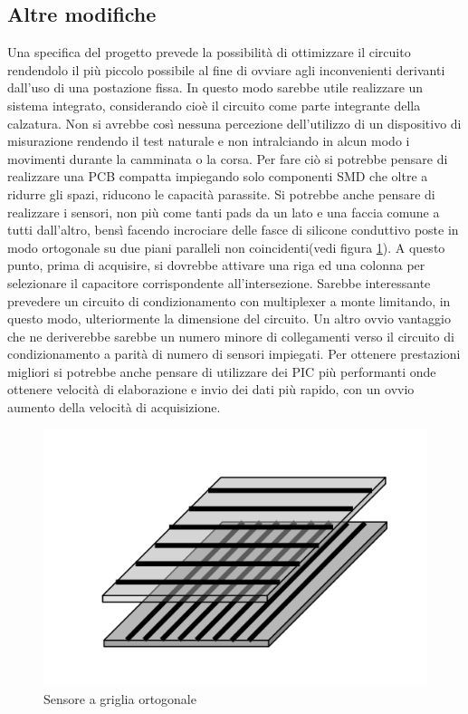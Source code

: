\documentclass[12pt,a4paper,oneside,openright,italian]{article}
\begin{document}
\subsection{Altre modifiche}
Una specifica del progetto prevede la possibilit\`a di ottimizzare il circuito rendendolo il pi\`u piccolo possibile al fine di ovviare agli inconvenienti derivanti dall'uso di una postazione fissa. In questo modo sarebbe utile realizzare un sistema integrato, considerando cio\`e il circuito come parte  integrante della calzatura. Non si avrebbe cos\`i nessuna percezione  dell'utilizzo di un dispositivo di misurazione rendendo il test naturale e  non intralciando in alcun modo i movimenti durante la camminata o la  corsa. Per fare ci\`o si potrebbe pensare di realizzare una PCB compatta  impiegando solo componenti SMD che oltre a ridurre gli spazi, riducono le  capacit\`a parassite. Si potrebbe anche pensare di realizzare i sensori, non  pi\`u come tanti pads da un lato e una faccia comune a tutti dall'altro, bens\`i facendo incrociare delle fasce di silicone conduttivo poste in modo  ortogonale su due piani paralleli non coincidenti(vedi figura \ref{sviluppi}).  A questo punto, prima di acquisire, si dovrebbe attivare una riga ed una colonna per selezionare il capacitore corrispondente all'intersezione.  Sarebbe interessante prevedere un circuito di condizionamento con  multiplexer a monte limitando, in questo modo, ulteriormente la  dimensione del circuito. Un altro ovvio vantaggio che ne deriverebbe  sarebbe un numero minore di collegamenti verso il circuito di condizionamento a parit\`a di numero di sensori impiegati. Per ottenere  prestazioni migliori si potrebbe anche pensare di utilizzare dei PIC pi\`u  performanti onde ottenere velocit\`a di elaborazione e invio dei dati pi\`u rapido, con un ovvio aumento della velocit\`a di acquisizione. 

\begin{figure}[!hbp]
  \centering
  \includegraphics[width=330pt]{immagini/sviluppi.png}
  \caption{Sensore a griglia ortogonale}
  \label{sviluppi}
\end{figure}
\end{document}
